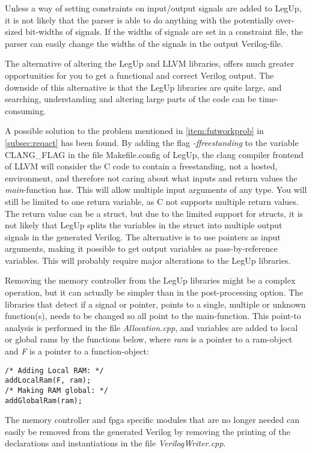Unless a way of setting constraints on input/output signals are added to LegUp, it is not likely that the parser is able to do anything with the potentially over-sized bit-widths of signals. If the widths of signals are set in a constraint file, the parser can easily change the widths of the signals in the output Verilog-file.

The alternative of altering the LegUp and LLVM libraries, offers much greater opportunities for you to get a functional and correct Verilog output. The downside of this alternative is that the LegUp libraries are quite large, and searching, understanding and altering large parts of the code can be time-consuming. 

A possible solution to the problem mentioned in \cref{item:futworkprob} in \cref{subsec:reqact} has been found. By adding the flag \textit{-ffreestanding} to the variable CLANG\_FLAG in the file Makefile.config of LegUp, the clang compiler frontend of LLVM will consider the C code to contain a freestanding, not a hosted, environment, and therefore not caring about what inputs and return values the \textit{main}-function has. This will allow multiple input arguments of any type. You will still be limited to one return variable, as C not supports multiple return values. The return value can be a struct, but due to the limited support for structs, it is not likely that LegUp splits the variables in the struct into multiple output signals in the generated Verilog. The alternative is to use pointers as input arguments, making it possible to get output variables as pass-by-reference variables. This will probably require major alterations to the LegUp libraries.   

Removing the memory controller from the LegUp libraries might be a complex operation, but it can actually be simpler than in the post-processing option. The libraries that detect if a signal or pointer, points to a single, multiple or unknown function(s), needs to be changed so all point to the main-function. This point-to analysis is performed in the file \textit{Allocation.cpp}, and variables are added to local or global \gls{ram}s by the functions below, where \textit{ram} is a pointer to a \gls{ram}-object and \textit{F} is a pointer to a function-object:
\lstset{language=C,style=Cstyle}
\begin{lstlisting}
/* Adding Local RAM: */
addLocalRam(F, ram);
/* Making RAM global: */
addGlobalRam(ram);
\end{lstlisting}

The memory controller and \gls{fpga} specific modules that are no longer needed can easily be removed from the generated Verilog by removing the printing of the declarations and instantiations in the file \textit{VerilogWriter.cpp}.

